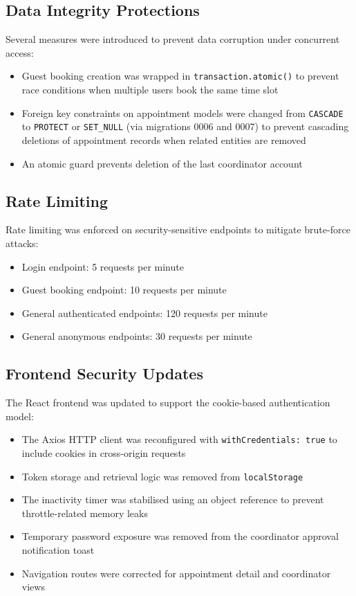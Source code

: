\documentclass[conference]{IEEEtran}
\begin{document}
\subsection{Data Integrity Protections}

Several measures were introduced to prevent data corruption under concurrent access:

\begin{itemize}
    \item Guest booking creation was wrapped in \texttt{transaction.atomic()} to prevent race conditions when multiple users book the same time slot
    \item Foreign key constraints on appointment models were changed from \texttt{CASCADE} to \texttt{PROTECT} or \texttt{SET\_NULL} (via migrations 0006 and 0007) to prevent cascading deletions of appointment records when related entities are removed
    \item An atomic guard prevents deletion of the last coordinator account
\end{itemize}

\subsection{Rate Limiting}

Rate limiting was enforced on security-sensitive endpoints to mitigate brute-force attacks:

\begin{itemize}
    \item Login endpoint: 5 requests per minute
    \item Guest booking endpoint: 10 requests per minute
    \item General authenticated endpoints: 120 requests per minute
    \item General anonymous endpoints: 30 requests per minute
\end{itemize}

\subsection{Frontend Security Updates}

The React frontend was updated to support the cookie-based authentication model:

\begin{itemize}
    \item The Axios HTTP client was reconfigured with \texttt{withCredentials: true} to include cookies in cross-origin requests
    \item Token storage and retrieval logic was removed from \texttt{localStorage}
    \item The inactivity timer was stabilised using an object reference to prevent throttle-related memory leaks
    \item Temporary password exposure was removed from the coordinator approval notification toast
    \item Navigation routes were corrected for appointment detail and coordinator views
\end{itemize}
\end{document}
